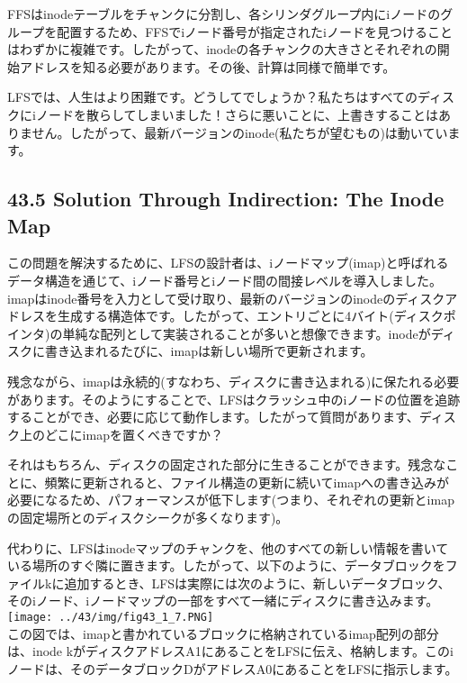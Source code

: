 FFSはinodeテーブルをチャンクに分割し、各シリンダグループ内にiノードのグループを配置するため、FFSでiノード番号が指定されたiノードを見つけることはわずかに複雑です。したがって、inodeの各チャンクの大きさとそれぞれの開始アドレスを知る必要があります。その後、計算は同様で簡単です。

LFSでは、人生はより困難です。どうしてでしょうか？私たちはすべてのディスクにiノードを散らしてしまいました！さらに悪いことに、上書きすることはありません。したがって、最新バージョンのinode(私たちが望むもの)は動いています。

\hypertarget{solution-through-indirection-the-inode-map}{%
\subsection*{43.5 Solution Through Indirection: The Inode
Map}\label{solution-through-indirection-the-inode-map}}

この問題を解決するために、LFSの設計者は、iノードマップ(imap)と呼ばれるデータ構造を通じて、iノード番号とiノード間の間接レベルを導入しました。imapはinode番号を入力として受け取り、最新のバージョンのinodeのディスクアドレスを生成する構造体です。したがって、エントリごとに4バイト(ディスクポインタ)の単純な配列として実装されることが多いと想像できます。inodeがディスクに書き込まれるたびに、imapは新しい場所で更新されます。

残念ながら、imapは永続的(すなわち、ディスクに書き込まれる)に保たれる必要があります。そのようにすることで、LFSはクラッシュ中のiノードの位置を追跡することができ、必要に応じて動作します。したがって質問があります、ディスク上のどこにimapを置くべきですか？

それはもちろん、ディスクの固定された部分に生きることができます。残念なことに、頻繁に更新されると、ファイル構造の更新に続いてimapへの書き込みが必要になるため、パフォーマンスが低下します(つまり、それぞれの更新とimapの固定場所とのディスクシークが多くなります)。

代わりに、LFSはinodeマップのチャンクを、他のすべての新しい情報を書いている場所のすぐ隣に置きます。したがって、以下のように、データブロックをファイルkに追加するとき、LFSは実際には次のように、新しいデータブロック、そのiノード、iノードマップの一部をすべて一緒にディスクに書き込みます。\\
\texttt{[image: ../43/img/fig43\_1\_7.PNG]}\\
この図では、imapと書かれているブロックに格納されているimap配列の部分は、inode
kがディスクアドレスA1にあることをLFSに伝え、格納します。このiノードは、そのデータブロックDがアドレスA0にあることをLFSに指示します。


